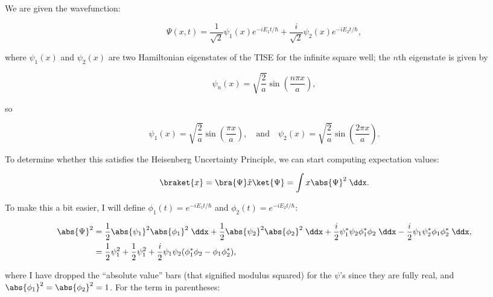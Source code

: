 \section{}

We are given the wavefunction:

\begin{equation}
    \Psi(x,t) = \frac{1}{\sqrt{2}} \psi_1(x)e^{-iE_1t/\hbar} + \frac{i}{\sqrt{2}}\psi_2(x) e^{-iE_2t/\hbar},\label{Prblm4Wavefunction}
\end{equation}

where $\psi_1(x)$ and $\psi_2(x)$ are two Hamiltonian eigenstates of the TISE for the infinite square well; the $n$th eigenstate is given by

\begin{equation}
    \psi_n(x) = \sqrt{\frac{2}{a}}\sin\left( \frac{n\pi x}{a} \right),
\end{equation}

so

\begin{equation}
    \psi_1(x) = \sqrt{\frac{2}{a}}\sin\left( \frac{\pi x}{a} \right), \quad \text{and} \quad \psi_2(x) = \sqrt{\frac{2}{a}}\sin\left( \frac{2\pi x}{a} \right).
\end{equation}

To determine whether this satisfies the Heisenberg Uncertainty Principle, we can start computing expectation values:

\begin{equation*}
    \braket{x} = \bra{\Psi} \hat{x} \ket{\Psi} = \int x \abs{\Psi}^2 \;\ddx.
\end{equation*}

To make this a bit easier, I will define $\phi_1(t) = e^{-iE_1t/\hbar}$ and $\phi_2(t) = e^{-iE_2t/\hbar}$:

\begin{align*}
    \abs{\Psi}^2 &= \frac{1}{2} \abs{\psi_1}^2\abs{\phi_1}^2 \;\ddx + \frac{1}{2} \abs{\psi_2}^2\abs{\phi_2}^2 \;\ddx + \frac{i}{2} \psi_1^*\psi_2\phi_1^*\phi_2 \;\ddx - \frac{i}{2} \psi_1\psi_2^*\phi_1\phi_2^* \;\ddx, \\
    &= \frac{1}{2}\psi_1^2 + \frac{1}{2}\psi_1^2 + \frac{i}{2}\psi_1\psi_2 (\phi_1^*\phi_2 - \phi_1\phi_2^*),
\end{align*}

where I have dropped the ``absolute value'' bars (that signified modulus squared) for the $\psi$'s since they are fully real, and $\abs{\phi_1}^2 = \abs{\phi_2}^2 = 1$. For the term in parentheses:

